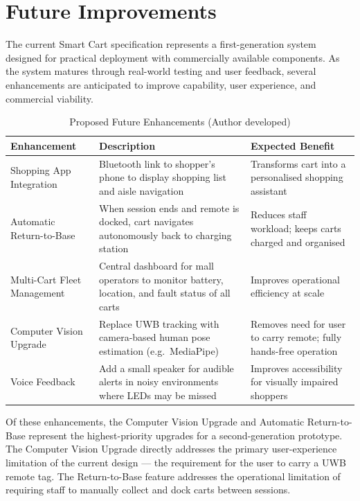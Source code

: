 \section{Future Improvements}

The current Smart Cart specification represents a first-generation system
designed for practical deployment with commercially available components.
As the system matures through real-world testing and user feedback, several
enhancements are anticipated to improve capability, user experience, and
commercial viability.

\begin{table}[!ht]
\caption{Proposed Future Enhancements (Author developed)}
\label{tab:future}
\centering
\footnotesize
\begin{tabular}{p{1.8cm} p{2.5cm} p{2.5cm}}
\toprule
\textbf{Enhancement} & \textbf{Description} & \textbf{Expected Benefit} \\
\midrule
Shopping App Integration & Bluetooth link to shopper's phone to display shopping list and aisle navigation & Transforms cart into a personalised shopping assistant \\
Automatic Return-to-Base & When session ends and remote is docked, cart navigates autonomously back to charging station & Reduces staff workload; keeps carts charged and organised \\
Multi-Cart Fleet Management & Central dashboard for mall operators to monitor battery, location, and fault status of all carts & Improves operational efficiency at scale \\
Computer Vision Upgrade & Replace UWB tracking with camera-based human pose estimation (e.g.\ MediaPipe) & Removes need for user to carry remote; fully hands-free operation \\
Voice Feedback & Add a small speaker for audible alerts in noisy environments where LEDs may be missed & Improves accessibility for visually impaired shoppers \\
\bottomrule
\end{tabular}
\end{table}

Of these enhancements, the Computer Vision Upgrade and Automatic
Return-to-Base represent the highest-priority upgrades for a
second-generation prototype. The Computer Vision Upgrade directly
addresses the primary user-experience limitation of the current
design --- the requirement for the user to carry a UWB remote tag.
The Return-to-Base feature addresses the operational limitation of
requiring staff to manually collect and dock carts between sessions.

